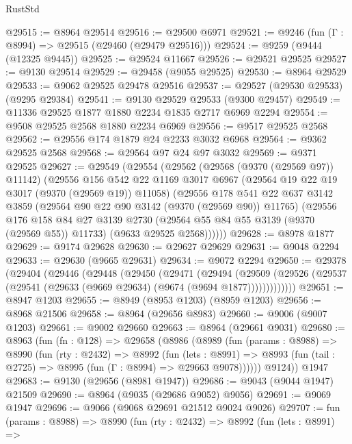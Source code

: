 \begin{lexlean}{RustStd}
\begin{coremodule}
@29515 := @8964 @29514
@29516 := @29500 @6971
@29521 := @9246 (fun (Γ : @8994) => @29515 (@29460 (@29479 @29516)))
@29524 := @9259 (@9444 (@12325 @9445))
@29525 := @29524 @11667
@29526 := @29521 @29525
@29527 := @9130 @29514
@29529 := @29458 (@9055 @29525)
@29530 := @8964 @29529
@29533 := @9062 @29525 @29478 @29516
@29537 := @29527 (@29530 @29533) (@9295 @29384)
@29541 := @9130 @29529 @29533 (@9300 @29457)
@29549 := @11336 @29525 @1877 @1880 @2234 @1835 @2717 @6969 @2294
@29554 := @9508 @29525 @2568 @1880 @2234 @6969
@29556 := @9517 @29525 @2568
@29562 := @29556 @174 @1879 @24 @2233 @3032 @6968
@29564 := @9362 @29525 @2568
@29568 := @29564 @97 @24 @97 @3032
@29569 := @9371 @29525
@29627 := @29549
    (@29554
      (@29562
        (@29568 (@9370 (@29569 @97)) @11142)
        (@29556
          @156
          @542
          @22
          @1169
          @3017
          @6967
          (@29564 @19 @22 @19 @3017 (@9370 (@29569 @19)) @11058)
          (@29556
            @178
            @541
            @22
            @637
            @3142
            @3859
            (@29564 @90 @22 @90 @3142 (@9370 (@29569 @90)) @11765)
            (@29556
              @176
              @158
              @84
              @27
              @3139
              @2730
              (@29564 @55 @84 @55 @3139 (@9370 (@29569 @55)) @11733)
              (@9633 @29525 @2568))))))
@29628 := @8978 @1877
@29629 := @9174 @29628
@29630 := @29627 @29629
@29631 := @9048 @2294
@29633 := @29630 (@9665 @29631)
@29634 := @9072 @2294
@29650 := @29378
    (@29404
      (@29446
        (@29448
          (@29450
            (@29471
              (@29494
                (@29509
                  (@29526 (@29537 (@29541 (@29633 (@9669 @29634) (@9674 (@9694 @1877)))))))))))))
@29651 := @8947 @1203
@29655 := @8949 (@8953 @1203) (@8959 @1203)
@29656 := @8968 @21506
@29658 := @8964 (@29656 @8983)
@29660 := @9006 (@9007 @1203)
@29661 := @9002 @29660
@29663 := @8964 (@29661 @9031)
@29680 := @8963
    (fun (fn : @128) =>
    @29658
      (@8986
        (@8989
          (fun (params : @8988) =>
          @8990
            (fun (rty : @2432) =>
            @8992
              (fun (lets : @8991) =>
              @8993 (fun (tail : @2725) => @8995 (fun (Γ : @8994) => @29663 @9078))))))
        @9124))
    @1947
@29683 := @9130 (@29656 (@8981 @1947))
@29686 := @9043 (@9044 @1947) @21509
@29690 := @8964 (@9035 (@29686 @9052) @9056)
@29691 := @9069 @1947
@29696 := @9066 (@9068 @29691 @21512 @9024 @9026)
@29707 := fun (params : @8988) =>
  @8990
    (fun (rty : @2432) =>
    @8992
      (fun (lets : @8991) =>

\end{coremodule}
\end{lexlean}
